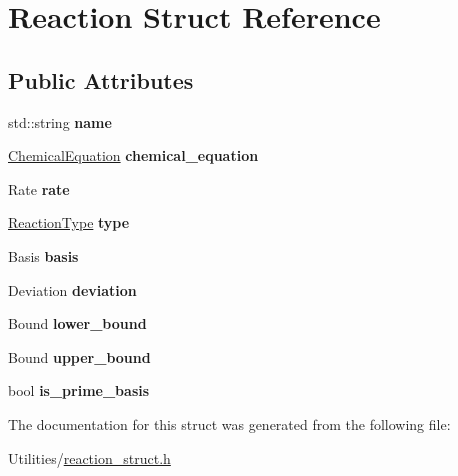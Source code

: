 \hypertarget{struct_reaction}{}\section{Reaction Struct Reference}
\label{struct_reaction}
\subsection*{Public Attributes}
\begin{DoxyCompactItemize}
\item 
\mbox{\label{struct_reaction_a007a60098dd724e05a69b3f181e34edd}} 
std\+::string {\bfseries name}
\item 
\mbox{\label{struct_reaction_a10cc1f0c4b9b8cb187997e306a112444}} 
\mbox{\hyperlink{struct_chemical_equation}{Chemical\+Equation}} {\bfseries chemical\+\_\+equation}
\item 
\mbox{\label{struct_reaction_a9ccbf041c2fa2b4ce855f8d77917a40f}} 
Rate {\bfseries rate}
\item 
\mbox{\label{struct_reaction_a784ebea34207d152f07cce1da02ce360}} 
\mbox{\hyperlink{reaction__struct_8h_a360e20f142dbd097b0d0d0620111b30b}{Reaction\+Type}} {\bfseries type}
\item 
\mbox{\label{struct_reaction_a45387418ffdee7e6c602e35e8cd8412d}} 
Basis {\bfseries basis}
\item 
\mbox{\label{struct_reaction_abdb65dbf825aa4546f46ee72ebc18f66}} 
Deviation {\bfseries deviation}
\item 
\mbox{\label{struct_reaction_a74455d474c047a50acb2909af8ded6df}} 
Bound {\bfseries lower\+\_\+bound}
\item 
\mbox{\label{struct_reaction_a33c6e10fae5e60be0f4f8780b1a0e767}} 
Bound {\bfseries upper\+\_\+bound}
\item 
\mbox{\label{struct_reaction_ad25df3b5a350731580c381966c9f0ee0}} 
bool {\bfseries is\+\_\+prime\+\_\+basis}
\end{DoxyCompactItemize}


The documentation for this struct was generated from the following file\+:\begin{DoxyCompactItemize}
\item 
Utilities/\mbox{\hyperlink{reaction__struct_8h}{reaction\+\_\+struct.\+h}}\end{DoxyCompactItemize}
